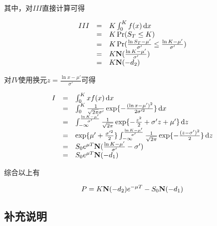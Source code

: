 其中，对$III$直接计算可得

\begin{equation}
    \begin{array}{rcl}
        III & = & K \int_0^K f(x) \,\mathrm{d} x                                                   \\
            & = & K \Pr(S_T \leq K)                                                       \\
            & = & K \Pr(\frac{\ln S_T - \mu'}{\sigma'} \leq \frac{\ln K - \mu'}{\sigma'}) \\
            & = & K \mathbf{N}(\frac{\ln K - \mu'}{\sigma'})                                      \\
            & = & K \mathbf{N}(-d_2)
    \end{array}
\end{equation}

对$IV$使用换元$z = \frac{\ln x - \mu'}{\sigma'}$可得

\begin{equation}
    \begin{array}{rcl}
        I & = & \int_0^K xf(x) \,\mathrm{d} x                                                                                                                      \\
          & = & \int_0^K \frac{1}{\sqrt{2\pi}\sigma'}\exp\{-\frac{(\ln x - \mu')^2}{2\sigma'^2}\} \,\mathrm{d} x                                                   \\
          & = & \int_{-\infty}^\frac{\ln K - \mu'}{\sigma'} \frac{1}{\sqrt{2\pi}} \exp\{-\frac{z^2}{2} + \sigma'z + \mu'\}\,\mathrm{d} z                           \\
          & = & \exp\{\mu'+\frac{\sigma'^2}{2}\} \int_{-\infty}^\frac{\ln K - \mu'}{\sigma'} \frac{1}{\sqrt{2\pi}}\exp\{-\frac{(z -\sigma')^2}{2}\} \,\mathrm{d} z \\
          & = & S_0 e^{\mu T} \mathbf{N}(\frac{\ln K - \mu'}{\sigma'} - \sigma')                                                                                  \\
          & = & S_0 e^{\mu T} \mathbf{N}(-d_1)
    \end{array}
\end{equation}

综合以上有

\begin{equation}
    P =  K\mathbf{N}(-d_2)e^{-\mu T} - S_0\mathbf{N}(-d_1)
\end{equation}

\subsection{补充说明}

